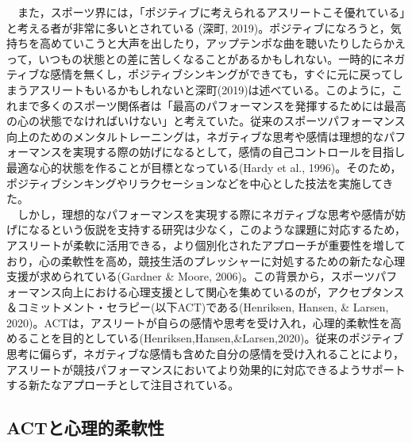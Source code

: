 \documentclass[12pt,a4paper,xelatex,ja=standard]{bxjsarticle}
\begin{document}
　また，スポーツ界には，「ポジティブに考えられるアスリートこそ優れている」と考える者が非常に多いとされている
(深町,
2019)。ポジティブになろうと，気持ちを高めていこうと大声を出したり，アップテンポな曲を聴いたりしたらかえって，いつもの状態との差に苦しくなることがあるかもしれない。一時的にネガティブな感情を無くし，ポジティブシンキングができても，すぐに元に戻ってしまうアスリートもいるかもしれないと深町(2019)は述べている。このように，これまで多くのスポーツ関係者は「最高のパフォーマンスを発揮するためには最高の心の状態でなければいけない」と考えていた。従来のスポーツパフォーマンス向上のためのメンタルトレーニングは，ネガティブな思考や感情は理想的なパフォーマンスを実現する際の妨げになるとして，感情の自己コントロールを目指し最適な心的状態を作ることが目標となっている(Hardy
et al.,
1996)。そのため，ポジティブシンキングやリラクセーションなどを中心とした技法を実施してきた。\\
　しかし，理想的なパフォーマンスを実現する際にネガティブな思考や感情が妨げになるという仮説を支持する研究は少なく，このような課題に対応するため，アスリートが柔軟に活用できる，より個別化されたアプローチが重要性を増しており，心の柔軟性を高め，競技生活のプレッシャーに対処するための新たな心理支援が求められている(Gardner
\& Moore,
2006)。この背景から，スポーツパフォーマンス向上における心理支援として関心を集めているのが，アクセプタンス＆コミットメント・セラピー(以下ACT)である(Henriksen,
Hansen, \& Larsen,
2020)。ACTは，アスリートが自らの感情や思考を受け入れ，心理的柔軟性を高めることを目的としている(Henriksen,Hansen,\&Larsen,2020)。従来のポジティブ思考に偏らず，ネガティブな感情も含めた自分の感情を受け入れることにより，アスリートが競技パフォーマンスにおいてより効果的に対応できるようサポートする新たなアプローチとして注目されている。

\hypertarget{actux3068ux5fc3ux7406ux7684ux67d4ux8edfux6027}{%
\subsection{ACTと心理的柔軟性}\label{actux3068ux5fc3ux7406ux7684ux67d4ux8edfux6027}}
\end{document}
